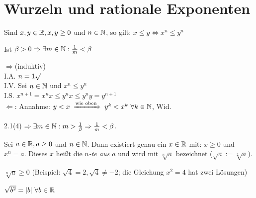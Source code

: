 \documentclass[a4paper,oneside,DIV15,BCOR12mm]{scrbook}
\begin{document}
\chapter{Wurzeln und rationale Exponenten}

\begin{wichtigerhilfssatz}
\begin{liste}
\item Sind $x,y\in\mathbb{R}, x,y\ge0$ und $n\in\mathbb{N}$, so gilt: $x\le y\Leftrightarrow x^{n}\le y^{n}$
\item Ist $\beta > 0\Rightarrow \exists m\in\mathbb{N}:\frac{1}{m} < \beta$
\end{liste}
\end{wichtigerhilfssatz}

\begin{beweise}
\item \glqq$\Rightarrow$\grqq (induktiv)\\
I.A. $n = 1 \surd$\\
I.V. Sei $n\in\mathbb{N}$ und $x^{n}\le y^{n}$\\
I.S. $x^{n+1}=x^{n}x\le y^{n}x\le y^{n}y=y^{n+1}$\\
\glqq$\Leftarrow$\grqq: Annahme: $y < x \folgtwegen{\text{wie oben}} y^{k} < x^{k} \ \forall k\in\MdN$, Wid.
\item 2.1(4) $\Rightarrow \exists m\in\mathbb{N}:m>\frac{1}{\beta}\Rightarrow\frac{1}{m}<\beta$.
\end{beweise}

\begin{wichtigedefinition}[Wurzeln]
Sei $a\in\mathbb{R}, a\ge0$ und $n\in\mathbb{N}$. Dann existiert genau ein $x\in\mathbb{R}$ mit: $x\ge0$ und $x^{n}=a$. Dieses $x$ heißt die \textit{$n$-te  aus $a$} und wird mit $\sqrt[n]{a}$ bezeichnet ($\sqrt{a} := \sqrt[2]{a}$).
\end{wichtigedefinition}

\begin{bemerkung}
\begin{liste}
\item $\sqrt[n]{a}\ge0$ (Beispiel: $\sqrt{4}=2, \sqrt{4}\ne-2$; die Gleichung $x^{2}=4$ hat zwei Lösungen)
\item $\sqrt{b^{2}}=|b|  \ \forall b\in\mathbb{R}$
\end{liste}
\end{bemerkung}
\end{document}

